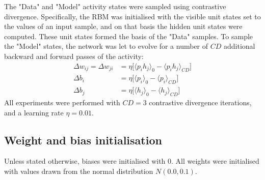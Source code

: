 \documentclass[11pt]{article}
\begin{document}
The "Data" and "Model" activity states were sampled using contrastive
divergence. Specifically, the RBM was initialised with the visible
unit states set to the values of an input sample, and on that basis
the hidden unit states were computed. These unit states formed the
basis of the "Data" samples. To sample the "Model" states, the network
was let to evolve for a number of $CD$ additional backward and forward
passes of the activity:
\begin{align}
  \label{eq:cd_update_equations}
  \Delta w_{ij} = \Delta w_{ji} &= \eta \Big[\langle p_{i}h_{j} \rangle_{0} - \langle p_{i}h_{j} \rangle_{CD}\Big] \\
  \Delta b_{i}                  &= \eta \Big[\langle p_{i}      \rangle_{0} - \langle p_{i}      \rangle_{CD}\Big] \\
  \Delta b_{j}                  &= \eta \Big[\langle h_{j}      \rangle_{0} - \langle h_{j}      \rangle_{CD}\Big]
\end{align}
All experiments were performed with $CD=3$ contrastive divergence
iterations, and a learning rate $\eta = 0.01$.




\subsection{Weight and bias initialisation}

Unless stated otherwise, biases were initialised with 0. All weights
were initialised with values drawn from the normal distribution
$N(0.0, 0.1)$.
\end{document}
